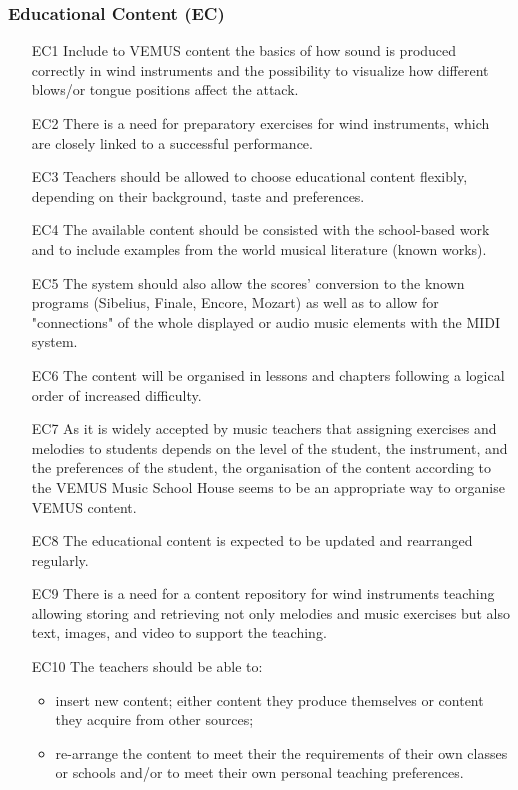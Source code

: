 \subsubsection{Educational Content (EC)}
\begin{itemize} \itemsep0em
\item[EC1] Include to VEMUS content the basics of how sound is produced correctly in wind instruments and the possibility to visualize how different blows/or tongue positions affect the attack.
\item[EC2] There is a need for preparatory exercises for wind instruments, which are closely linked to a successful performance.
\item[EC3] Teachers should be allowed to choose educational content flexibly, depending on their background, taste and preferences.
\item[EC4] The available content should be consisted with the school-based work and to include examples from the world musical literature (known works).
\item[EC5] The system should also allow the scores’ conversion to the known programs (Sibelius, Finale, Encore, Mozart) as well as to allow for "connections" of the whole displayed or audio music elements with the MIDI system.
\item[EC6] The content will be organised  in lessons and chapters following a logical order of increased difficulty.
\item[EC7] As it is widely accepted by music teachers that assigning exercises and melodies to students depends on the level of the student, the instrument, and the preferences of the student, the organisation of the content according to the VEMUS Music School House seems to be an appropriate way to organise VEMUS content.
\item[EC8] The educational content is expected to be updated and rearranged regularly.
\item[EC9] There is a need for a content repository for wind instruments teaching allowing storing and retrieving not only melodies and music exercises but also text, images, and video to support the teaching.
\item[EC10] The teachers should be able to:\begin{itemize} \itemsep0em
\item insert new content; either content they produce themselves or content they acquire from other sources;
\item re-arrange the content to meet their the requirements of their own classes or schools and/or to meet their own personal teaching preferences.
\end{itemize}

\end{itemize}